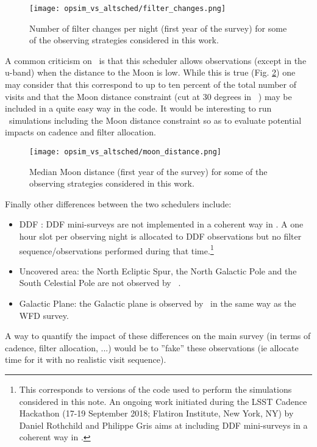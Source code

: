 \begin{figure}[!htbp]
  \begin{center}
    \texttt{[image: opsim\_vs\_altsched/filter\_changes.png]}
    \caption{Number of filter changes per night (first year of the survey) for some of the observing strategies considered in this work.}\label{fig:filter_changes}
    \end{center}
\end{figure}

A common criticism on \altsched~is that this scheduler allows observations (except in the u-band) when the distance to the Moon is low. While this is true (Fig. \ref{fig:moondist}) one may consider that this correspond to up to ten percent of the total number of visits and that the Moon distance constraint (cut at 30 degrees in \opsim~) may be included in a quite easy way in the code. It would be interesting to run \altsched~simulations including the Moon distance constraint so as to evaluate potential impacts on cadence and filter allocation.

\begin{figure}[!htbp]
  \begin{center}
    \texttt{[image: opsim\_vs\_altsched/moon\_distance.png]}
    \caption{Median Moon distance (first year of the survey) for some of the observing strategies considered in this work.}\label{fig:moondist}
    \end{center}
\end{figure}


Finally other differences between the two schedulers include:
\begin{itemize}
\item{DDF} : DDF mini-surveys are not implemented in a coherent way in \altsched. A one hour slot per observing night is allocated to DDF observations but no filter sequence/observations performed during that time.\footnote{This corresponds to versions of the code used to perform the simulations considered in this note. An ongoing work initiated during the LSST Cadence Hackathon (17-19 September 2018; Flatiron Institute, New York, NY) by Daniel Rothchild and Philippe Gris aims at including DDF mini-surveys in a coherent way in \altsched.}
\item{Uncovered area}:  the North Ecliptic Spur, the North Galactic Pole and the South Celestial Pole are not observed by \altsched~.
\item{Galactic Plane}: the Galactic plane is observed by \altsched~in the same way as the WFD survey.

\end{itemize}

A way to quantify the impact of these differences on the main survey (in terms of cadence, filter allocation, ...) would be to ''fake'' these observations (ie allocate time for it with no realistic visit sequence).
